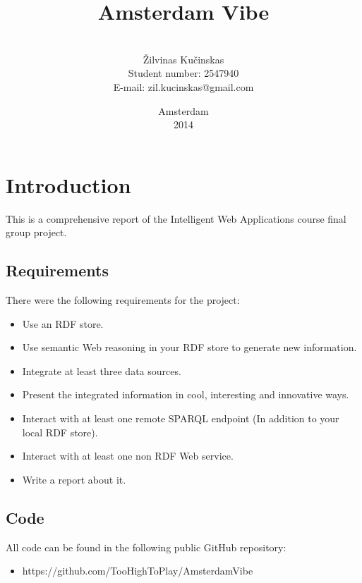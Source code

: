 \documentclass[12pt, a4paper, lithuanian]{article}
\title{Amsterdam Vibe}
\author{
    \\
    Žilvinas Kučinskas \\
    Student number: 2547940 \\
    E-mail: zil.kucinskas@gmail.com
}
\date{Amsterdam \\ 2014}
\begin{document}
\maketitle

\tableofcontents

\section{Introduction}

This is a comprehensive report of the Intelligent Web Applications course final group project.

\subsection{Requirements}

There were the following requirements for the project:

\begin{itemize}
    \item Use an RDF store.

    \item Use semantic Web reasoning in your RDF store to generate new information.

    \item Integrate at least three data sources.

    \item Present the integrated information in cool, interesting and innovative ways.

    \item Interact with at least one remote SPARQL endpoint (In addition to your local RDF store).

    \item Interact with at least one non RDF Web service.

    \item Write a report about it.

\end{itemize}


\subsection{Code}

All code can be found in the following public GitHub repository:

\begin{itemize}

  \item https://github.com/TooHighToPlay/AmsterdamVibe

\end{itemize}
\end{document}

